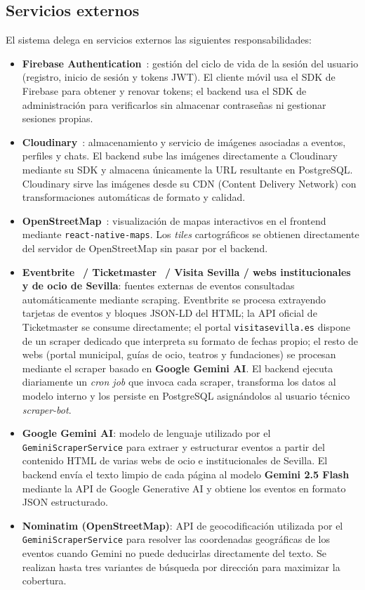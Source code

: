 \subsection{Servicios externos}

El sistema delega en servicios externos las siguientes responsabilidades:

\begin{itemize}
    \item \textbf{Firebase Authentication}~\cite{firebase}: gestión del ciclo de vida de la sesión del usuario (registro, inicio de sesión y tokens JWT). El cliente móvil usa el SDK de Firebase para obtener y renovar tokens; el backend usa el SDK de administración para verificarlos sin almacenar contraseñas ni gestionar sesiones propias.
    \item \textbf{Cloudinary}~\cite{cloudinary}: almacenamiento y servicio de imágenes asociadas a eventos, perfiles y chats. El backend sube las imágenes directamente a Cloudinary mediante su SDK y almacena únicamente la URL resultante en PostgreSQL. Cloudinary sirve las imágenes desde su CDN (Content Delivery Network) con transformaciones automáticas de formato y calidad.
    \item \textbf{OpenStreetMap}~\cite{openstreetmap}: visualización de mapas interactivos en el frontend mediante \texttt{react-native-maps}. Los \textit{tiles} cartográficos se obtienen directamente del servidor de OpenStreetMap sin pasar por el backend.
    \item \textbf{Eventbrite}~\cite{eventbrite} \textbf{/ Ticketmaster}~\cite{ticketmaster} \textbf{/ Visita Sevilla / webs institucionales y de ocio de Sevilla}: fuentes externas de eventos consultadas automáticamente mediante scraping. Eventbrite se procesa extrayendo tarjetas de eventos y bloques JSON-LD del HTML; la API oficial de Ticketmaster se consume directamente; el portal \texttt{visitasevilla.es} dispone de un scraper dedicado que interpreta su formato de fechas propio; el resto de webs (portal municipal, guías de ocio, teatros y fundaciones) se procesan mediante el scraper basado en \textbf{Google Gemini AI}. El backend ejecuta diariamente un \textit{cron job} que invoca cada scraper, transforma los datos al modelo interno y los persiste en PostgreSQL asignándolos al usuario técnico \textit{scraper-bot}.
    \item \textbf{Google Gemini AI}: modelo de lenguaje utilizado por el \texttt{GeminiScraperService} para extraer y estructurar eventos a partir del contenido HTML de varias webs de ocio e institucionales de Sevilla. El backend envía el texto limpio de cada página al modelo \textbf{Gemini 2.5 Flash} mediante la API de Google Generative AI y obtiene los eventos en formato JSON estructurado.
    \item \textbf{Nominatim (OpenStreetMap)}: API de geocodificación utilizada por el \texttt{GeminiScraperService} para resolver las coordenadas geográficas de los eventos cuando Gemini no puede deducirlas directamente del texto. Se realizan hasta tres variantes de búsqueda por dirección para maximizar la cobertura.
\end{itemize}

